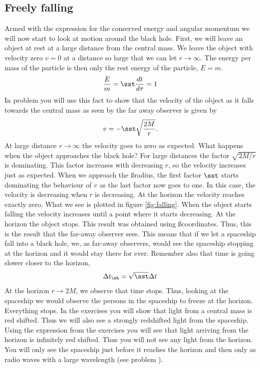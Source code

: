 {\begin{multicols}{2}
\section{Freely falling}
\label{sect:falling}

Armed with the expression for the conserved energy and angular momentum we will now start to look at motion around the black hole. First, we will leave an object at rest at a large distance from the central mass. We leave the object with velocity zero $v=0$ at a distance so large that we can let $r\rightarrow\infty$. The energy per mass of the particle is then only the rest energy of the particle, $E=m$.
\[
\frac{E}{m}=\sst\frac{dt}{d\tau}=1
\]
In problem  you will use this fact to show that the velocity of the object as it falls towards the central mass as seen by the far away observer is given by
\begin{equation}
\label{eq:v}
v=-\sst\sqrt{\frac{2M}{r}}.
\end{equation}
At large distance $r\rightarrow\infty$ the velocity goes to zero as expected. What happens when the object approaches the black hole? For large distances the factor $\sqrt{2M/r}$ is dominating. This factor increases with decreasing $r$, so the velocity increases just as expected. When we approach the \ss radius, the first factor $\sst$ starts dominating the behaviour of $v$ as the last factor now goes to one. In this case, the velocity is decreasing when $r$ is decreasing. At the horizon the velocity reaches exactly zero. What we see is plotted in figure \ref{fig:falling}. When the object starts falling the velocity increases until a point where it starts decreasing. At the horizon the object stops. This result was obtained using \ss coordinates. Thus, this is the result that the far-away observer sees. This means that if we let a spaceship fall into a black hole, we, as far-away observers, would see the spaceship stopping at the horizon and it would stay there for ever. Remember also that time is going slower closer to the horizon,
\[
\Delta t_\sh=\sqrt{\sst}\Delta t
\]
At the horizon $r\rightarrow 2M$, we observe that time stops. Thus, looking at the spaceship we would observe the persons in the spaceship to freeze at the horizon. Everything stops. In the exercises you will show that light from a central mass is red shifted. Thus we will also see a strongly redshifted light from the spaceship. Using the expression from the exercises you will see that light arriving from the horizon is infinitely red shifted. Thus you will not see any light from the horizon. You will only see the spaceship just before it reaches the horizon and then only as radio waves with a large wavelength (see problem ).


\end{multicols}}
